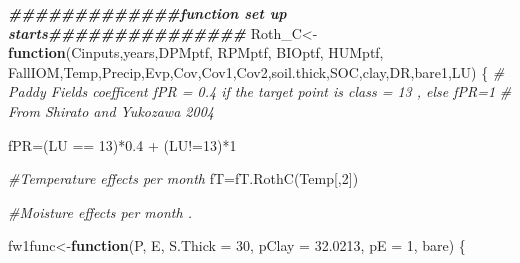 \documentclass[
  10pt,
  b5paper,
]{book}
\newenvironment{Shaded}{\begin{snugshade}}{\end{snugshade}}
\newcommand{\AttributeTok}[1]{\textcolor[rgb]{0.77,0.63,0.00}{#1}}
\newcommand{\CommentTok}[1]{\textcolor[rgb]{0.56,0.35,0.01}{\textit{#1}}}
\newcommand{\ControlFlowTok}[1]{\textcolor[rgb]{0.13,0.29,0.53}{\textbf{#1}}}
\newcommand{\DecValTok}[1]{\textcolor[rgb]{0.00,0.00,0.81}{#1}}
\newcommand{\DocumentationTok}[1]{\textcolor[rgb]{0.56,0.35,0.01}{\textbf{\textit{#1}}}}
\newcommand{\FloatTok}[1]{\textcolor[rgb]{0.00,0.00,0.81}{#1}}
\newcommand{\FunctionTok}[1]{\textcolor[rgb]{0.00,0.00,0.00}{#1}}
\newcommand{\NormalTok}[1]{#1}
\newcommand{\OtherTok}[1]{\textcolor[rgb]{0.56,0.35,0.01}{#1}}
\newcommand{\SpecialCharTok}[1]{\textcolor[rgb]{0.00,0.00,0.00}{#1}}
\begin{document}
\begin{Shaded}
\begin{Highlighting}[]
\DocumentationTok{\#\#\#\#\#\#\#\#\#\#\#\#\#function set up starts\#\#\#\#\#\#\#\#\#\#\#\#\#\#\#}
\NormalTok{Roth\_C}\OtherTok{\textless{}{-}}\ControlFlowTok{function}\NormalTok{(Cinputs,years,DPMptf, RPMptf, BIOptf, HUMptf, FallIOM,Temp,Precip,Evp,Cov,Cov1,Cov2,soil.thick,SOC,clay,DR,bare1,LU)}
\NormalTok{\{}
\CommentTok{\# Paddy Fields coefficent fPR = 0.4 if the target point is class = 13 , else fPR=1}
\CommentTok{\# From Shirato and Yukozawa 2004}

\NormalTok{fPR}\OtherTok{=}\NormalTok{(LU }\SpecialCharTok{==} \DecValTok{13}\NormalTok{)}\SpecialCharTok{*}\FloatTok{0.4} \SpecialCharTok{+}\NormalTok{ (LU}\SpecialCharTok{!=}\DecValTok{13}\NormalTok{)}\SpecialCharTok{*}\DecValTok{1}

\CommentTok{\#Temperature effects per month}
\NormalTok{fT}\OtherTok{=}\FunctionTok{fT.RothC}\NormalTok{(Temp[,}\DecValTok{2}\NormalTok{]) }

\CommentTok{\#Moisture effects per month . }

\NormalTok{fw1func}\OtherTok{\textless{}{-}}\ControlFlowTok{function}\NormalTok{(P, E, }\AttributeTok{S.Thick =} \DecValTok{30}\NormalTok{, }\AttributeTok{pClay =} \FloatTok{32.0213}\NormalTok{, }\AttributeTok{pE =} \DecValTok{1}\NormalTok{, bare) }
\NormalTok{\{}
   

\end{Highlighting}
\end{Shaded}
\end{document}
